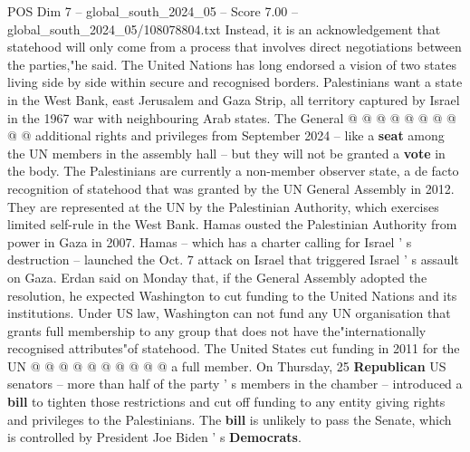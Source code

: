 \begin{textsample}{POS Dim 7 – global\_south\_2024\_05 – Score 7.00 – global\_south\_2024\_05/108078804.txt}
Instead, it is an acknowledgement that statehood will only come from a process that involves direct negotiations between the parties,"he said.
The United Nations has long endorsed a vision of two states living side by side within secure and recognised borders.
Palestinians want a state in the West Bank, east Jerusalem and Gaza Strip, all territory captured by Israel in the 1967 war with neighbouring Arab states.
The General @ @ @ @ @ @ @ @ @ @ additional rights and privileges from September 2024 -- like a \textbf{seat} among the UN members in the assembly hall -- but they will not be granted a \textbf{vote} in the body.
The Palestinians are currently a non-member observer state, a de facto recognition of statehood that was granted by the UN General Assembly in 2012.
They are represented at the UN by the Palestinian Authority, which exercises limited self-rule in the West Bank.
Hamas ousted the Palestinian Authority from power in Gaza in 2007.
Hamas -- which has a charter calling for Israel ' s destruction -- launched the Oct. 7 attack on Israel that triggered Israel ' s assault on Gaza.
Erdan said on Monday that, if the General Assembly adopted the resolution, he expected Washington to cut funding to the United Nations and its institutions.
Under US law, Washington can not fund any UN organisation that grants full membership to any group that does not have the"internationally recognised attributes"of statehood.
The United States cut funding in 2011 for the UN @ @ @ @ @ @ @ @ @ @ a full member.
On Thursday, 25 \textbf{Republican} US senators -- more than half of the party ' s members in the chamber -- introduced a \textbf{bill} to tighten those restrictions and cut off funding to any entity giving rights and privileges to the Palestinians.
The \textbf{bill} is unlikely to pass the Senate, which is controlled by President Joe Biden ' s \textbf{Democrats}.

\end{textsample}

